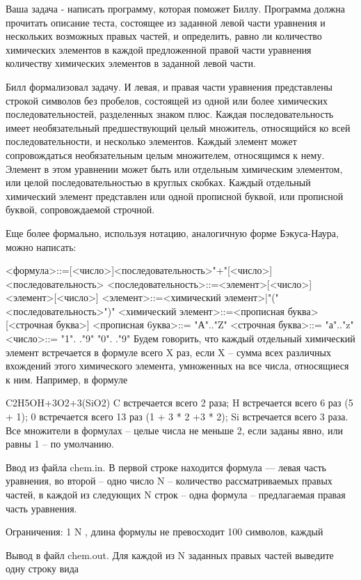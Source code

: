 \documentclass[]{article}
\begin{document}
\begin{enumerate}
Ваша задача - написать программу, которая поможет Биллу. Программа должна прочитать описание теста, состоящее из заданной левой части уравнения и нескольких возможных правых частей, и определить, равно ли количество химических элементов в каждой предложенной правой части уравнения количеству химических элементов в заданной левой части.

Билл формализовал задачу. И левая, и правая части уравнения представлены строкой символов без пробелов, состоящей из одной или более химических последовательностей, разделенных знаком плюс. Каждая последовательность имеет необязательный предшествующий целый множитель, относящийся ко всей последовательности, и несколько элементов. Каждый элемент может сопровождаться необязательным целым множителем, относящимся к нему. Элемент в этом уравнении может быть или отдельным химическим элементом, или целой последовательностью в круглых скобках. Каждый отдельный химический элемент представлен или одной прописной буквой, или прописной буквой, сопровождаемой строчной.

Еще более формально, используя нотацию, аналогичную форме Бэкуса-Наура, можно написать:

<формула>::=[<число>]<последовательность>{"+"[<число>]<последовательность>}
<последовательность>::=<элемент>[<число>]{<элемент>[<число>]} 
<элемент>::=<химический элемент>|"("<последовательность>")" 
<химический элемент>::=<прописная буква>[<строчная буква>] 
<прописная 6уква>::= "А".."Z" 
<строчная буква>::= "а".."z" 
<число>::= "1". ."9" {"0". ."9"}
Будем говорить, что каждый отдельный химический элемент встречается в формуле всего X раз, если X – сумма всех различных вхождений этого химического элемента, умноженных на все числа, относящиеся к ним. Например, в формуле

C2H5OH+3O2+3(SiO2)
C встречается всего 2 раза;
H встречается всего 6 раз (5 + 1);
0 встречается всего 13 раз (1 + 3 * 2 +3 * 2);
Si встречается всего 3 раза.
Все множители в формулах – целые числа не меньше 2, если заданы явно, или равны 1 – по умолчанию.

Ввод из файла chem.in. В первой строке находится формула — левая часть уравнения, во второй – одно число N – количество рассматриваемых правых частей, в каждой из следующих N строк – одна формула – предлагаемая правая часть уравнения.

Ограничения: 1 \leq N , длина формулы не превосходит 100 символов, каждый

Вывод в файл chem.out. Для каждой из N заданных правых частей выведите одну строку вида


\end{enumerate}
\end{document}
